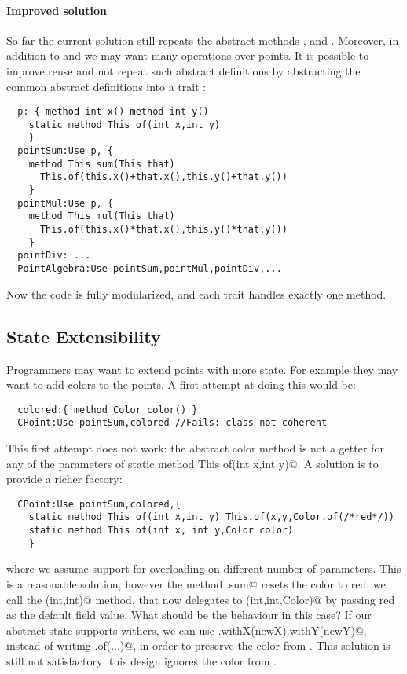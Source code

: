   \paragraph{Improved solution} So far the current solution still
  repeats the abstract methods \Q@x@, \Q@y@ and \Q@of@.
  Moreover, in addition to \Q@sum@ and \Q@mul@ we may want many
  operations over points. It is possible to improve reuse
  and not repeat such abstract definitions by abstracting the common
  abstract definitions into a trait \Q@p@: 
\saveSpace
\begin{lstlisting}
  p: { method int x() method int y()
    static method This of(int x,int y)
    }
  pointSum:Use p, { 
    method This sum(This that)
      This.of(this.x()+that.x(),this.y()+that.y())
    }
  pointMul:Use p, { 
    method This mul(This that)
      This.of(this.x()*that.x(),this.y()*that.y())
    }
  pointDiv: ...
  PointAlgebra:Use pointSum,pointMul,pointDiv,...
\end{lstlisting}
\saveSpace      
Now the code is fully modularized, and each trait handles exactly one method.

\subsection{State Extensibility}
Programmers may want to extend points with more state. For example 
they may want to add colors to the points. A first attempt at doing
this would be:
\saveSpace
\begin{lstlisting}
  colored:{ method Color color() }
  CPoint:Use pointSum,colored //Fails: class not coherent
\end{lstlisting}
\saveSpace
This first attempt does not work: the abstract color method
is not a getter for any of the parameters of 
\Q@ static method This of(int x,int y)@. 
A solution is to provide a richer factory:
\saveSpace
\begin{lstlisting}
  CPoint:Use pointSum,colored,{
    static method This of(int x,int y) This.of(x,y,Color.of(/*red*/))
    static method This of(int x, int y,Color color)
    }
\end{lstlisting}
\saveSpace
\noindent 
where we assume support for overloading on different number of parameters.
This is a reasonable solution, however the method \Q@CPoint.sum@ resets
the color to red: we call the \Q@of(int,int)@ method, that now
delegates to \Q@of(int,int,Color)@ by passing red as the default field
value.  What should be the behaviour in this case?  If our abstract
state supports withers, we can use
\Q@this.withX(newX).withY(newY)@, instead of writing \Q@This.of(...)@, in order to preserve the color from
\Q@this@.  This solution is still not satisfactory: this design ignores
the color from \Q@that@.

